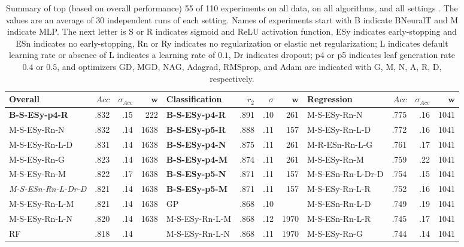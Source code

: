 \documentclass[11pt,a4paper]{article}
\begin{document}
    
\begin{table}[]
    \tiny
    \centering 
    \renewcommand{\arraystretch}{1.2}
    \setlength{\tabcolsep}{5pt}
    \caption{Summary of top (based on overall performance) 55 of 110 experiments on all data, on all algorithms, and all settings . The values are an average of 30 independent runs of each setting. Names of experiments start with B indicate BNeuralT and M indicate MLP. The next letter is S or R indicates sigmoid and ReLU activation function, ESy indicates early-stopping and ESn indicates no early-stopping, Rn or Ry indicates no regularization or elastic net regularization; L indicates default learning rate or absence of L indicates a learning rate of $0.1$, Dr indicates dropout; p4 or p5 indicates leaf generation rate $0.4$ or $0.5$, and optimizers GD, MGD, NAG, Adagrad, RMSprop, and Adam are  indicated with G, M, N, A, R, D, respectively.
\label{tab:All_experiments_A}}
    \begin{tabular}[t]{lrrrlrrrlrrr}
        \toprule
        Overall & $Acc$ & $\sigma_{Acc}$ & $\textbf{w}$ & Classification & $r_2$ & $\sigma$ & $\textbf{w}$ & Regression & $Acc$ & $\sigma_{Acc}$ & $\textbf{w}$ \\
        \midrule
        \textbf{B-S-ESy-p4-R} & .832 & .15 & 222 & \textbf{B-S-ESy-p4-R} & .891 & .10 & 261 & M-S-ESy-Rn-N & .775 & .16 & 1041  \\
        M-S-ESy-Rn-N & .832 & .14 & 1638 & \textbf{B-S-ESy-p5-R} & .888 & .11 & 157 & M-S-ESy-Rn-L-D & .772 & .16 & 1041  \\
        M-S-ESy-Rn-L-D & .831 & .14 & 1638 & \textbf{B-S-ESy-p4-N} & .875 & .11 & 261 & M-R-ESn-Rn-L-G & .761 & .17 & 1041  \\
        M-S-ESy-Rn-G & .823 & .14 & 1638 & \textbf{B-S-ESy-p4-M} & .874 & .11 & 261 & M-S-ESy-Rn-M & .759 & .22 & 1041  \\
        M-S-ESy-Rn-M & .822 & .17 & 1638 & \textbf{B-S-ESy-p5-N} & .871 & .11 & 157 & M-S-ESn-Rn-L-Dr-D & .754 & .15 & 1041  \\
        \textit{M-S-ESn-Rn-L-Dr-D} & .821 & .14 & 1638 & \textbf{B-S-ESy-p5-M} & .871 & .11 & 157 & M-S-ESy-Rn-L-R & .752 & .16 & 1041  \\
        M-S-ESy-Rn-L-M & .821 & .14 & 1638 & GP & .868 & .10 &  & M-S-ESn-Rn-L-D & .749 & .19 & 1041  \\
        M-S-ESy-Rn-L-N & .820 & .14 & 1638 & M-S-ESy-Rn-L-M & .868 & .12 & 1970 & M-S-ESn-Rn-L-R & .745 & .17 & 1041  \\
        RF & .818 & .14 &  & M-S-ESy-Rn-L-N & .868 & .11 & 1970 & M-S-ESy-Rn-G & .744 & .14 & 1041  \\

\end{tabular}
\end{table}
\end{document}

